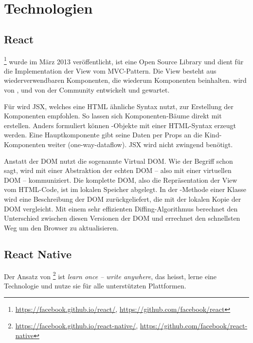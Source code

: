 \chapter{Technologien}
\label{pd-technologien}


\section{React} 
\footnote{\url{https://facebook.github.io/react/}, \url{https://github.com/facebook/react}} wurde im März 2013 veröffentlicht\cite{react-release-date}, ist eine Open Source  \gls{Library} und dient für die Implementation der View vom \gls{MVC}-Pattern. 
Die View besteht aus wiederverwendbaren Komponenten, die wiederum Komponenten beinhalten.
 wird von ,  und von der Community entwickelt und gewartet.\cite{react}

Für  wird \gls{JSX}, welches eine HTML ähnliche Syntax nutzt, zur Erstellung der Komponenten empfohlen. 
So lassen sich Komponenten-Bäume direkt mit  erstellen. 
Anders formuliert können -Objekte mit einer HTML-Syntax erzeugt werden. 
Eine Hauptkomponente gibt seine Daten per Props an die Kind-Komponenten weiter (one-way-dataflow).\cite{react-data-flow} 
\gls{JSX} wird nicht zwingend benötigt.\cite{jsx-syntax} 

Anstatt der \gls{DOM} nutzt  die sogenannte \gls{Virtual DOM}.
Wie der Begriff schon sagt, wird mit einer Abstraktion der echten \gls{DOM} -- also mit einer virtuellen DOM -- kommuniziert.
Die komplette \gls{DOM}, also die Repräsentation der View vom HTML-Code, ist im lokalen Speicher abgelegt.\cite{virtual-dom}
In der -Methode einer Klasse wird eine Beschreibung der DOM zurückgeliefert, die  mit der lokalen Kopie der \gls{DOM} vergleicht.
Mit einem sehr effizienten Diffing-Algorithmus berechnet  den Unterschied zwischen diesen  Versionen der \gls{DOM} und errechnet den schnellsten Weg um den Browser zu aktualisieren.\cite{react-virtual-dom}


\section{React Native}
Der Ansatz von \footnote{\url{https://facebook.github.io/react-native/}, \url{https://github.com/facebook/react-native}} ist \textit{learn once -- write anywhere}, das heisst, lerne eine Technologie und nutze sie für alle unterstützten Plattformen.\cite{react-native}

